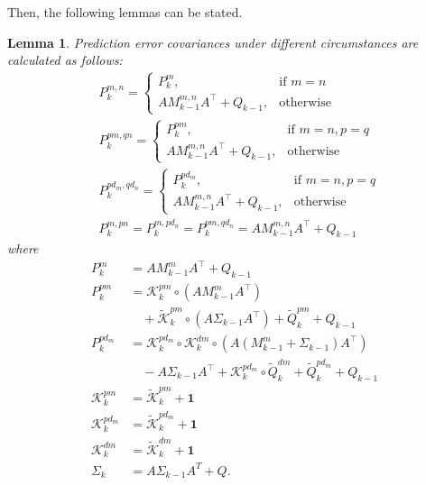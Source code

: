 \documentclass[twocolumn]{IEEEtran}
\newtheorem{lemma}{Lemma}
\begin{document}
Then, the following lemmas can be stated.
\begin{lemma}\label{perror}
Prediction error covariances under different circumstances are calculated as follows:
\begin{align*}
&P_{k}^{m,n} =\left\{\begin{array}{cl}%
P_{k}^{m}, &\text{if $m=n$}\\
AM_{k-1}^{m,n}A^\top+Q_{k-1}, &\text{otherwise}
\end{array}\right.\\
&P^{pm,qn}_{k} =\left\{\begin{array}{cl}
P_{k}^{pm}, &\text{if $m=n,p=q$}\\
AM_{k-1}^{m,n}A^\top+Q_{k-1}, &\text{otherwise}
\end{array}\right.\\
&P^{pd_m,qd_n}_{k} =\left\{\begin{array}{cl}
P_{k}^{pd_m}, &\text{if $m=n,p=q$}\\
AM_{k-1}^{m,n}A^\top+Q_{k-1}, &\text{otherwise}
\end{array}\right.\\
&P^{m,pn}_{k}=P^{m,pd_n}_{k}=P^{pm,qd_n}_{k}=AM_{k-1}^{m,n}A^\top+Q_{k-1}
\end{align*}
where
\begin{equation*}
\begin{split}
P_{k}^{m}&=AM_{k-1}^{m}A^\top+Q_{k-1}\\
P_{k}^{pm}&=\mathscr{K}_{k}^{pm}\circ (AM_{k-1}^{m}A^\top)\\
&\quad+\tilde{\mathscr{K}}_{k}^{pm}\circ(A\Sigma_{k-1}A^\top)+\tilde{Q}_{k}^{pm}+Q_{k-1}\\
P_{k}^{pd_m}&=\mathscr{K}_{k}^{pd_m}\circ\mathscr{K}_{k}^{dm}\circ(A(M_{k-1}^{m}+\Sigma_{k-1})A^\top)\\
&\quad-A\Sigma_{k-1}A^\top+\mathscr{K}_{k}^{pd_m}\circ\tilde{Q}_{k}^{dm}+\tilde{Q}_{k}^{pd_m}+Q_{k-1}\\
\mathscr{K}_{k}^{pm}&=\tilde{\mathscr{K}}_{k}^{pm}+\mathbf{1}\\
\mathscr{K}_{k}^{pd_m}&=\tilde{\mathscr{K}}_{k}^{pd_m}+\mathbf{1}\\
\mathscr{K}_{k}^{dm}&=\tilde{\mathscr{K}}_{k}^{dm}+\mathbf{1}\\
\Sigma_{k}&=A\Sigma_{k-1}A^T+Q.
\end{split}
\end{equation*}
\end{lemma}
\end{document}
